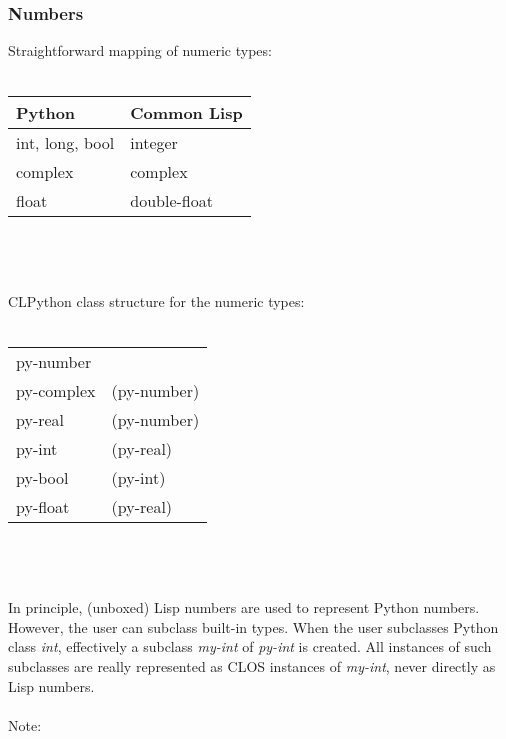 \documentclass{article}
\begin{document}
\subsubsection{Numbers}
Straightforward mapping of numeric types: \\
\\
\begin{tabular}{ll}
 Python & Common Lisp \\
\hline
 int, long, bool & integer \\
 complex     & complex     \\
 float       & double-float \\
\end{tabular} \\
\\ \\
CLPython class structure for the numeric types: \\
\\ 
\begin{tabular}{ll}
\hline
py-number \\
py-complex & (py-number) \\
py-real & (py-number) \\
py-int & (py-real) \\
py-bool & (py-int) \\
py-float & (py-real) \\
\hline
\end{tabular} \\
\\
\\ In principle, (unboxed) Lisp numbers are used to represent Python
numbers. However, the user can subclass built-in types. When the user
subclasses Python class {\em int}, effectively a subclass {\em my-int}
of {\em py-int} is created. All instances of such subclasses are
really represented as CLOS instances of {\em my-int}, never
directly as Lisp numbers. \\
\\
Note:
\end{document}
